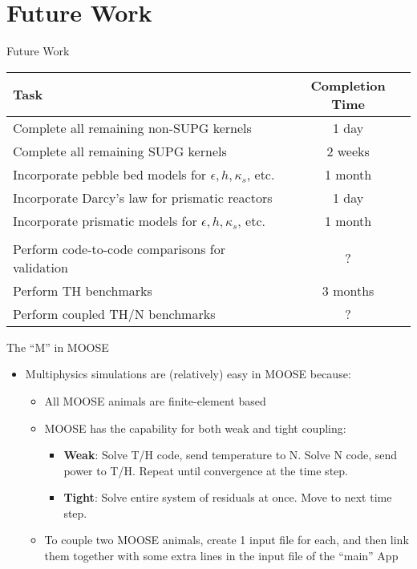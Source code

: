 \documentclass{beamer}
\begin{document}

\section{Future Work}

\begin{frame}{Future Work}

\begin{table}[H]
\centering
\begin{tabular}{l c}
\hline\hline
Task & Completion Time\\ [0.5ex]
\hline
Complete all remaining non-SUPG kernels 						& 1 day\\
Complete all remaining SUPG kernels 							& 2 weeks\\
Incorporate pebble bed models for \(\epsilon, h, \kappa_s\), etc. 		& 1 month\\
Incorporate Darcy's law for prismatic reactors 						& 1 day\\
Incorporate prismatic models for \(\epsilon, h, \kappa_s\), etc. 			& 1 month\\
& \\
Perform code-to-code comparisons for validation					& ?\\
Perform TH benchmarks										& 3 months\\
Perform coupled TH/N benchmarks								& ?\\
\end{tabular}
\end{table}

\end{frame}


\begin{frame}{The ``M'' in MOOSE}

\begin{itemize}
\item Multiphysics simulations are (relatively) easy in MOOSE because:
	\begin{itemize}
		\item All MOOSE animals are finite-element based
		\item MOOSE has the capability for both weak and tight coupling:
			\begin{itemize}
				\item \textbf{Weak}: Solve T/H code, send temperature to N. Solve N code, send power to T/H. Repeat until convergence at the time step.
				\item \textbf{Tight}: Solve entire system of residuals at once. Move to next time step.
			\end{itemize}
		\item To couple two MOOSE animals, create 1 input file for each, and then link them together with some extra lines in the input file of the ``main'' App
	\end{itemize}
\end{itemize}

\end{frame}
\end{document}
